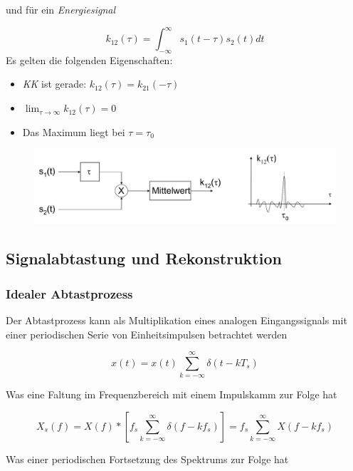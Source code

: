 \documentclass[
  10pt,
  a4paper,
  german]{article}
\numberwithin{equation}{section}
\begin{document}
und für ein \emph{Energiesignal}

\[
k_{12}(\tau)=\int_{-\infty}^{\infty}{s_1(t-\tau)s_2(t)dt}
\] Es gelten die folgenden Eigenschaften:

\begin{itemize}
\item
  \emph{KK} ist gerade: \(k_{12}(\tau)=k_{21}(-\tau)\)
\item
  \(\lim_{\tau\rightarrow\infty}k_{12}(\tau)=0\)
\item
  Das Maximum liegt bei \(\tau=\tau_0\)
\end{itemize}

\begin{figure}[H]

{\centering \includegraphics{images/02_Kreuzkorrelation.png}

}

\end{figure}

\hypertarget{signalabtastung-und-rekonstruktion}{%
\subsection{Signalabtastung und
Rekonstruktion}\label{signalabtastung-und-rekonstruktion}}

\hypertarget{idealer-abtastprozess}{%
\subsubsection{Idealer Abtastprozess}\label{idealer-abtastprozess}}

Der Abtastprozess kann als Multiplikation eines analogen Eingangssignals
mit einer periodischen Serie von Einheitsimpulsen betrachtet werden

\[
x(t)=x(t)\sum_{k=-\infty}^{\infty}{\delta(t-kT_s)}
\]

Was eine Faltung im Frequenzbereich mit einem Impulskamm zur Folge hat

\[
X_s(f)=X(f)*\left[f_s\sum_{k=-\infty}^{\infty}{\delta(f-kf_s)}\right]=f_s\sum_{k=-\infty}^{\infty}{X(f-kf_s)}
\]

Was einer periodischen Fortsetzung des Spektrums zur Folge hat
\end{document}
